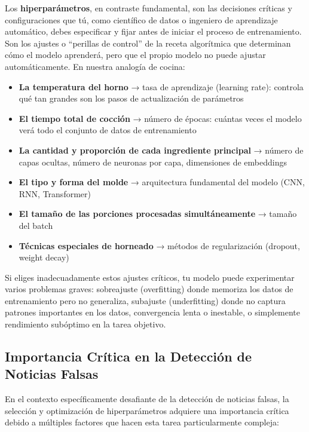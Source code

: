 Los \textbf{hiperparámetros}, en contraste fundamental, son las decisiones críticas y configuraciones que tú, como científico de datos o ingeniero de aprendizaje automático, debes especificar y fijar antes de iniciar el proceso de entrenamiento. Son los ajustes o ``perillas de control'' de la receta algorítmica que determinan cómo el modelo aprenderá, pero que el propio modelo no puede ajustar automáticamente. En nuestra analogía de cocina:

\begin{itemize}
    \item \textbf{La temperatura del horno} → tasa de aprendizaje (learning rate): controla qué tan grandes son los pasos de actualización de parámetros
    \item \textbf{El tiempo total de cocción} → número de épocas: cuántas veces el modelo verá todo el conjunto de datos de entrenamiento
    \item \textbf{La cantidad y proporción de cada ingrediente principal} → número de capas ocultas, número de neuronas por capa, dimensiones de embeddings
    \item \textbf{El tipo y forma del molde} → arquitectura fundamental del modelo (CNN, RNN, Transformer)
    \item \textbf{El tamaño de las porciones procesadas simultáneamente} → tamaño del batch
    \item \textbf{Técnicas especiales de horneado} → métodos de regularización (dropout, weight decay)
\end{itemize}

Si eliges inadecuadamente estos ajustes críticos, tu modelo puede experimentar varios problemas graves: sobreajuste (overfitting) donde memoriza los datos de entrenamiento pero no generaliza, subajuste (underfitting) donde no captura patrones importantes en los datos, convergencia lenta o inestable, o simplemente rendimiento subóptimo en la tarea objetivo.

\subsection{Importancia Crítica en la Detección de Noticias Falsas}

En el contexto específicamente desafiante de la detección de noticias falsas, la selección y optimización de hiperparámetros adquiere una importancia crítica debido a múltiples factores que hacen esta tarea particularmente compleja:

